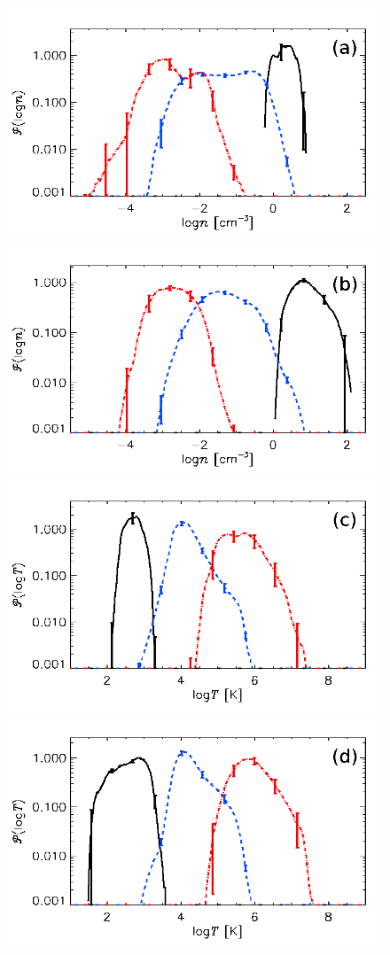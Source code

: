   \begin{figure}
  \centering
  \includegraphics[width=0.9\linewidth]{fig/o1pr_npdf3s.png}  
  \includegraphics[width=0.9\linewidth]{fig/o1ph_npdf3s.png}\\  
  \includegraphics[width=0.9\linewidth]{fig/o1pr_tpdf3s.png}
  \includegraphics[width=0.9\linewidth]{fig/o1ph_tpdf3s.png}  

\end{figure}
